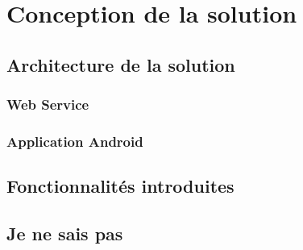 \section{Conception de la solution}

\subsection{Architecture de la solution}

    \subsubsection{Web Service}

    \subsubsection{Application Android}

\subsection{Fonctionnalités introduites}


\subsection{Je ne sais pas}